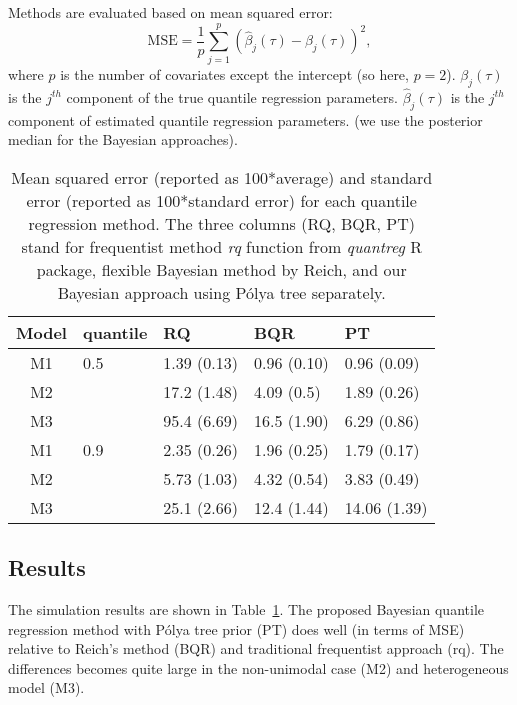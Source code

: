 \documentclass[12pt]{article}
\newcommand{\polya}{P\'{o}lya}
\begin{document}
Methods are evaluated based on mean squared error:
\begin{displaymath}
  \text{MSE}  = \frac{1}{p} \sum_{j=1}^p (\hat{\beta}_j(\tau) -
  \beta_j(\tau))^2,
\end{displaymath}
where $p$ is the number of covariates except the intercept (so here,
$p=2$). $\beta_j(\tau)$ is the $j^{th}$ component of the true quantile
regression parameters. $\hat{\beta}_j(\tau)$ is the $j^{th}$ component
of estimated quantile regression parameters. (we use the posterior
median for the Bayesian approaches).

\begin{center}
  \begin{table}[h]
    \centering
    \caption[]{ Mean squared error (reported as 100*average) and standard
      error (reported as 100*standard error) for each
      quantile regression method.   The three
      columns (RQ, BQR,
      PT) stand for frequentist method \textit{rq} function from
      \textit{quantreg} R package, flexible Bayesian method by Reich, and
      our Bayesian approach using \polya{} tree separately.}
    \vspace{4mm}
    \begin{tabular}[tb]{cllll}
      \toprule
      Model & quantile & RQ         & BQR        & PT          \\
      \hline
      M1    & 0.5      & 1.39 (0.13) & 0.96 (0.10) & 0.96 (0.09)  \\
      M2    &          & 17.2 (1.48) & 4.09 (0.5)  & 1.89 (0.26)  \\
      M3    &          & 95.4 (6.69) & 16.5 (1.90) & 6.29 (0.86)  \\
      \hline
      M1    & 0.9      & 2.35 (0.26) & 1.96 (0.25) & 1.79 (0.17)  \\
      M2    &          & 5.73 (1.03) & 4.32 (0.54) & 3.83 (0.49)  \\
      M3    &          & 25.1 (2.66) & 12.4 (1.44) & 14.06 (1.39) \\
      \bottomrule
    \end{tabular}
    \label{tab:1}
  \end{table}
\end{center}

\subsection{Results}
The simulation results are shown in Table~\ref{tab:1}. The proposed
Bayesian quantile regression method with \polya{} tree prior (PT) does
well (in terms of MSE) relative to Reich's method (BQR) and
traditional frequentist approach (rq).  The differences becomes quite
large in the non-unimodal case (M2) and heterogeneous model (M3).
\end{document}

